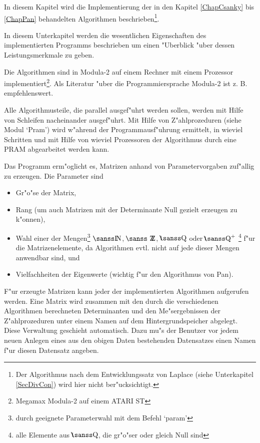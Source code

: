 %
%
\label{ChapImplemen}

In diesem Kapitel wird die Implementierung der in den Kapitel 
\ref{ChapCsanky} bis \ref{ChapPan} behandelten Algorithmen 
beschrieben\footnote{Der Algorithmus nach dem Entwicklungssatz von
Laplace (siehe Unterkapitel \ref{SecDivCon}) wird hier nicht 
ber"ucksichtigt.}.

\label{SecAnford}

In diesem Unterkapitel werden die wesentlichen Eigenschaften des
implementierten Programms beschrieben um einen "Uberblick "uber dessen
Leistungsmerkmale zu geben.

Die Algorithmen sind in Modula-2 auf einem Rechner mit einem Prozessor
implementiert\footnote{Megamax Modula-2 auf einem ATARI ST}. 
Als Literatur "uber die Programmiersprache Modula-2 ist
z. B. \cite{DCLR86} empfehlenswert.

Alle Algorithmusteile, die parallel ausgef"uhrt werden sollen,
werden mit Hilfe von Schleifen nacheinander ausgef"uhrt. Mit Hilfe von
Z"ahlprozeduren (siehe Modul `Pram') wird w"ahrend der Programmausf"uhrung
ermittelt, in wieviel Schritten und mit Hilfe von wieviel Prozessoren der
Algorithmus durch eine PRAM abgearbeitet werden kann.

Das Programm erm"oglicht es, Matrizen anhand von Parametervorgaben 
zuf"allig zu erzeugen. Die Parameter sind
\begin{itemize}
\item Gr"o"se der Matrix,
\item
      Rang (um auch Matrizen mit der Determinante Null gezielt 
      erzeugen zu k"onnen),
\item
      Wahl einer der Mengen\footnote{durch geeignete Parameterwahl mit dem 
      Befehl `param'}  $\Nat$, $\Integers$, $\Rationals$ oder
      $\Rationals^+$ \footnote{alle Elemente aus $\Rationals$, die
      gr"o"ser oder gleich Null sind} f"ur die Matrizenelemente,
      da Algorithmen evtl. nicht auf jede dieser Mengen anwendbar sind,
      und
\item 
      Vielfachheiten der Eigenwerte (wichtig f"ur den Algorithmus von Pan).
\end{itemize}

F"ur erzeugte Matrizen kann jeder der implementierten Algorithmen aufgerufen
werden. Eine Matrix wird zusammen mit den durch die verschiedenen 
Algorithmen berechneten Determinanten und den Me"sergebnissen der 
Z"ahlprozeduren unter einem Namen auf dem Hintergrundspeicher abgelegt. 
Diese Verwaltung geschieht automatisch. Dazu mu"s der Benutzer vor jedem
neuen Anlegen eines aus den obigen Daten bestehenden Datensatzes einen
Namen f"ur diesen Datensatz angeben.

